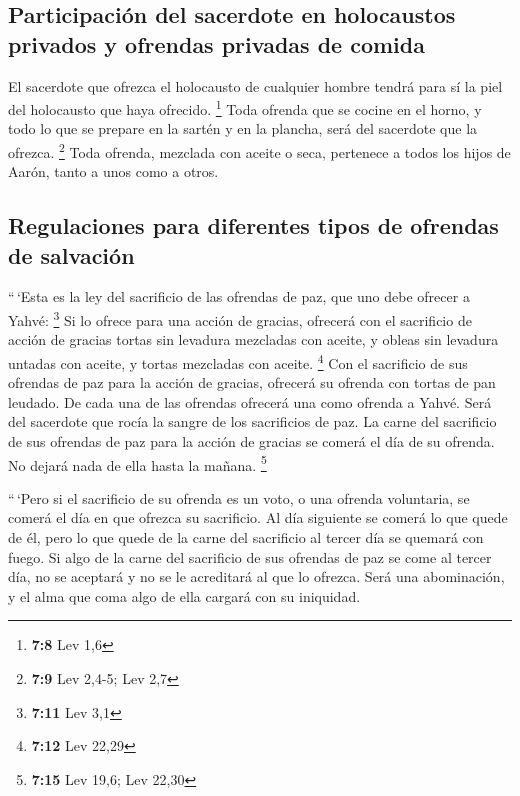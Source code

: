 \hypertarget{participaciuxf3n-del-sacerdote-en-holocaustos-privados-y-ofrendas-privadas-de-comida}{%
\subsection{Participación del sacerdote en holocaustos privados y
ofrendas privadas de
comida}\label{participaciuxf3n-del-sacerdote-en-holocaustos-privados-y-ofrendas-privadas-de-comida}}

 El sacerdote que ofrezca el holocausto de cualquier
hombre tendrá para sí la piel del holocausto que haya ofrecido.
\footnote{\textbf{7:8} Lev 1,6}  Toda ofrenda que se
cocine en el horno, y todo lo que se prepare en la sartén y en la
plancha, será del sacerdote que la ofrezca. \footnote{\textbf{7:9} Lev
  2,4-5; Lev 2,7}  Toda ofrenda, mezclada con aceite o
seca, pertenece a todos los hijos de Aarón, tanto a unos como a otros.

\hypertarget{regulaciones-para-diferentes-tipos-de-ofrendas-de-salvaciuxf3n}{%
\subsection{Regulaciones para diferentes tipos de ofrendas de
salvación}\label{regulaciones-para-diferentes-tipos-de-ofrendas-de-salvaciuxf3n}}

 ``\,`Esta es la ley del sacrificio de las ofrendas de
paz, que uno debe ofrecer a Yahvé: \footnote{\textbf{7:11} Lev 3,1}
 Si lo ofrece para una acción de gracias, ofrecerá con el
sacrificio de acción de gracias tortas sin levadura mezcladas con
aceite, y obleas sin levadura untadas con aceite, y tortas mezcladas con
aceite. \footnote{\textbf{7:12} Lev 22,29}  Con el
sacrificio de sus ofrendas de paz para la acción de gracias, ofrecerá su
ofrenda con tortas de pan leudado.  De cada una de las
ofrendas ofrecerá una como ofrenda a Yahvé. Será del sacerdote que rocía
la sangre de los sacrificios de paz.  La carne del
sacrificio de sus ofrendas de paz para la acción de gracias se comerá el
día de su ofrenda. No dejará nada de ella hasta la mañana. \footnote{\textbf{7:15}
  Lev 19,6; Lev 22,30}

 ``\,`Pero si el sacrificio de su ofrenda es un voto, o
una ofrenda voluntaria, se comerá el día en que ofrezca su sacrificio.
Al día siguiente se comerá lo que quede de él,  pero lo
que quede de la carne del sacrificio al tercer día se quemará con fuego.
 Si algo de la carne del sacrificio de sus ofrendas de
paz se come al tercer día, no se aceptará y no se le acreditará al que
lo ofrezca. Será una abominación, y el alma que coma algo de ella
cargará con su iniquidad.

